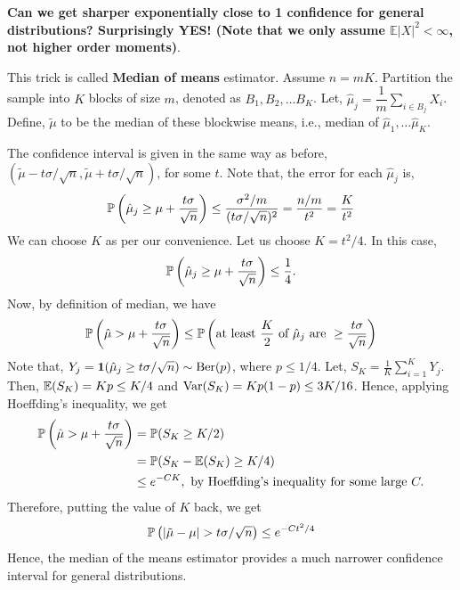 \documentclass[12pt]{article}
\begin{document}
\textbf{Can we get sharper exponentially close to 1 confidence for general distributions? Surprisingly YES! (Note that we only assume \( \mathbb{E}|X|^2 < \infty \), not higher order moments)}.

This trick is called \textbf{Median of means} estimator. Assume $n = mK$. Partition the sample into $K$ blocks of size $m$, denoted as $B_1, B_2, \dots B_K$. Let, $\hat{\mu}_j = \dfrac{1}{m}\sum_{i \in B_j} X_i$. Define, $\tilde{\mu}$ to be the median of these blockwise means, i.e., median of $\hat{\mu}_1, \dots \hat{\mu}_K$.

The confidence interval is given in the same way as before, $\left( \tilde{\mu} - t\sigma/\sqrt{n}, \tilde{\mu}+t\sigma/\sqrt{n} \right)$, for some $t$. Note that, the error for each $\hat{\mu}_j$ is,
\begin{equation*}
    \mathbb{P}\left(\hat{\mu}_j \geq \mu + \frac{t \sigma}{\sqrt{n}}\right) \leq \frac{\sigma^2/m}{(t \sigma/\sqrt{n})^2} = \frac{n/m}{t^2} = \frac{K}{t^2}
\end{equation*}
\noindent We can choose $K$ as per our convenience. Let us choose $K = t^2/4$. In this case,
\begin{equation*}
    \mathbb{P}\left(\hat{\mu}_j \geq \mu + \frac{t \sigma}{\sqrt{n}}\right) \leq \frac{1}{4}.
\end{equation*}
\noindent Now, by definition of median, we have
\begin{equation*}
    \mathbb{P}\left(\hat{\mu} > \mu + \frac{t \sigma}{\sqrt{n}}\right) \leq \mathbb{P}\left(\text{at least } \frac{K}{2} \text{ of } \hat{\mu}_j \text{ are } \geq \frac{t \sigma}{\sqrt{n}}\right)
\end{equation*}
\noindent Note that, $Y_j = \boldsymbol{1}(\hat{\mu}_j \geq t\sigma/\sqrt{n}) \sim \text{Ber}(p)$, where $p \leq 1/4$. Let, $S_K = \frac{1}{K}\sum_{i=1}^K Y_j$. Then, $\mathbb{E}(S_K) = Kp \leq K/4$ and $\mathrm{Var}(S_K) = Kp(1-p) \leq 3K/16$. Hence, applying Hoeffding's inequality, we get
\begin{align*}
    \mathbb{P}\left(\hat{\mu} > \mu + \frac{t \sigma}{\sqrt{n}}\right)
     & = \mathbb{P}(S_K \geq K/2)                                              \\
     & = \mathbb{P}(S_K - \mathbb{E}(S_K) \geq K/4)                                    \\
     & \leq e^{-CK}, \text{ by Hoeffding's inequality for some large } C.
\end{align*}
\noindent Therefore, putting the value of $K$ back, we get
\begin{equation*}
    \mathbb{P}\left( \vert \tilde{\mu} - \mu\vert > t\sigma/\sqrt{n} \right) \leq e^{-Ct^2/4}
\end{equation*}
\noindent Hence, the median of the means estimator provides a much narrower confidence interval for general distributions.
\end{document}
